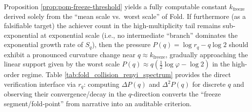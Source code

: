 \begin{remark}\label{rem:pom-freeze-prediction}
Proposition \ref{prop:pom-freeze-threshold} yields a fully computable constant \(k_{\mathrm{freeze}}\) derived solely from the ``mean scale vs.\ worst scale'' of Fold.
If furthermore (as a falsifiable target) the achiever count in the high-multiplicity tail remains sub-exponential at exponential scale (i.e., no intermediate ``branch'' dominates the exponential growth rate of \(S_q\)), then the pressure
\(
P(q)=\log r_q-q\log2
\)
should exhibit a pronounced curvature change near \(q\approx k_{\mathrm{freeze}}\), gradually approaching the linear support given by the worst scale
\(
P(q)\approx q(\tfrac12\log\varphi-\log2)
\)
in the high-order regime.
Table \ref{tab:fold_collision_renyi_spectrum} provides the direct verification interface via \(r_q\): computing \(\Delta P(q)\) and \(\Delta^2P(q)\) for discrete \(q\) and observing their convergence/decay in the \(q\)-direction converts the ``freeze segment/fold-point'' from narrative into an auditable criterion.
\end{remark}

